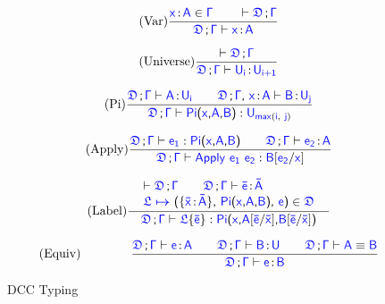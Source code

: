 \begin{figure}[H]
\renewcommand{\arraystretch}{1.3}
	\begin{equation}
		\tag{Var}
		\frac
			{\itemtype{x}{A} \in \target{\Gamma} \qquad
			 \vdash \target{\fdef}\semicolon \target{\Gamma} }
			{\target{\fdef}\semicolon \target{\Gamma} \vdash \itemtype{x}{A}}
	\end{equation}

	\begin{equation}
		\tag{Universe}
		\frac
			{\vdash \target{\fdef}\semicolon \target{\Gamma} }
			{\target{\fdef}\semicolon \target{\Gamma} \vdash \itemtype{U_i}{U_{i+1}}}
	\end{equation}

	\begin{equation}
		\tag{Pi}
		\frac
			{\target{\fdef}\semicolon \target{\Gamma} \vdash \itemtype{A}{U_i} \qquad
			 \target{\fdef}\semicolon \target{\Gamma}\sfcomma \itemtype{x}{A} \vdash \itemtype{B}{U_j}
			}
			{\target{\fdef}\semicolon \target{\Gamma} \vdash \targetpi{x}{A}{B} \mathrel{:} \target{U}_{\target{max}(\target{i},\ \target{j})} }
	\end{equation}

	\begin{equation}
		\tag{Apply}
		\frac
			{\target{\fdef}\semicolon \target{\Gamma} \vdash \target{e_1} \mathrel{:} \targetpi{x}{A}{B} \qquad
			 \target{\fdef}\semicolon \target{\Gamma} \vdash \itemtype{e_2}{A} }
			{\target{\fdef}\semicolon \target{\Gamma} \vdash \targetapp{e_1}{e_2} \mathrel{:} \target{B} \targetsub{e_2}{x}}
	\end{equation}

	\begin{equation}
		\tag{Label}
		\frac
			{\begin{array}{l}
			  	\vdash \target{\fdef}\semicolon \target{\Gamma} \qquad \target{\fdef}\semicolon \target{\Gamma} \vdash \itemtype{\bar{e}}{\bar{A}} \\
			  	\itemdef{\target{\flabel}}{\itemtype{\bar{x}}{\bar{A}}}{\targetpi{x}{A}{B}}{\target{e}} \in \target{\fdef} \\
			 \end{array}	 
			}
			{\quad \target{\fdef}\semicolon \target{\Gamma} \vdash \targetlab{\flabel}{\bar{e}} \mathrel{:} 
			 \target{Pi}\textsf{(}\target{x}\textsf{,} \target{A} \targetsub{\bar{e}}{\bar{x}}\textsf{,} \target{B} \targetsub{\bar{e}}{\bar{x}}\textsf{)} \quad
			}
	\end{equation}

	\begin{equation}
		\tag{Equiv}
		\qquad\qquad
		\frac
			{\target{\fdef}\semicolon \target{\Gamma} \vdash \itemtype{e}{A} \qquad
			 \target{\fdef}\semicolon \target{\Gamma} \vdash \itemtype{B}{U} \qquad
			 \target{\fdef}\semicolon \target{\Gamma} \vdash \target{A} \equiv \target{B}
			}
			{\target{\fdef}\semicolon \target{\Gamma} \vdash \itemtype{e}{B}}
	\end{equation}
	\caption{DCC Typing}
    \label{fig:dcc typing}
\end{figure}

